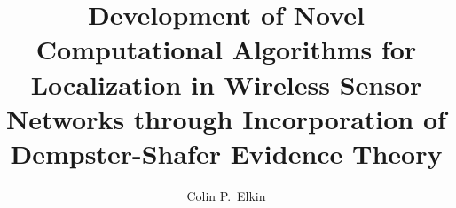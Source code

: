 \documentclass[12pt]{uthesis-v12}  %
\begin{document}


\title{Development of Novel Computational Algorithms for Localization in Wireless Sensor
       \protect\\ Networks through Incorporation of Dempster-Shafer Evidence Theory}

\author{Colin P.~Elkin}



\end{document}
